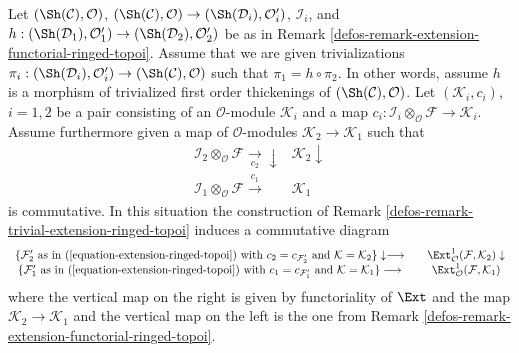 \begin{remark}
Let $(\Sh(\mathcal{C}), \mathcal{O})$,
$(\Sh(\mathcal{C}), \mathcal{O}) \to (\Sh(\mathcal{D}_i), \mathcal{O}'_i)$,
$\mathcal{I}_i$, and $h : (\Sh(\mathcal{D}_1), \mathcal{O}'_1) \to
(\Sh(\mathcal{D}_2), \mathcal{O}'_2)$ be as in
Remark \ref{defos-remark-extension-functorial-ringed-topoi}.
Assume that we are given trivializations
$\pi_i : (\Sh(\mathcal{D}_i), \mathcal{O}'_i) \to
(\Sh(\mathcal{C}), \mathcal{O})$ such that
$\pi_1 = h \circ \pi_2$. In other words, assume $h$ is a morphism
of trivialized first order thickenings of $(\Sh(\mathcal{C}), \mathcal{O})$.
Let $(\mathcal{K}_i, c_i)$, $i = 1, 2$ be a pair consisting of an
$\mathcal{O}$-module $\mathcal{K}_i$ and a map
$c_i : \mathcal{I}_i \otimes_\mathcal{O} \mathcal{F} \to
\mathcal{K}_i$. Assume furthermore given a map
of $\mathcal{O}$-modules $\mathcal{K}_2 \to \mathcal{K}_1$
such that
$$
\begin{array}{cc}\mathcal{I}_2 \otimes_\mathcal{O} \mathcal{F}
\underset{c_2}{\longrightarrow}\downarrow & \mathcal{K}_2 \downarrow \\ \mathcal{I}_1 \otimes_\mathcal{O} \mathcal{F}
\overset{c_1}{\longrightarrow} & \mathcal{K}_1\end{array}
$$
is commutative. In this situation the construction of
Remark \ref{defos-remark-trivial-extension-ringed-topoi} induces
a commutative diagram
$$
\begin{array}{ccc}\{\mathcal{F}'_2\text{ as in (\ref{equation-extension-ringed-topoi}) with }
c_2 = c_{\mathcal{F}'_2}\text{ and }\mathcal{K} = \mathcal{K}_2\}
\downarrow\longrightarrow &  & \Ext^1_\mathcal{O}(\mathcal{F}, \mathcal{K}_2) \downarrow \\ \{\mathcal{F}'_1\text{ as in (\ref{equation-extension-ringed-topoi}) with }
c_1 = c_{\mathcal{F}'_1}\text{ and }\mathcal{K} = \mathcal{K}_1\}
\longrightarrow &  & \Ext^1_\mathcal{O}(\mathcal{F}, \mathcal{K}_1)\end{array}
$$
where the vertical map on the right is given by functoriality of $\Ext$
and the map $\mathcal{K}_2 \to \mathcal{K}_1$ and the vertical map on the left
is the one from Remark \ref{defos-remark-extension-functorial-ringed-topoi}.
\end{remark}

